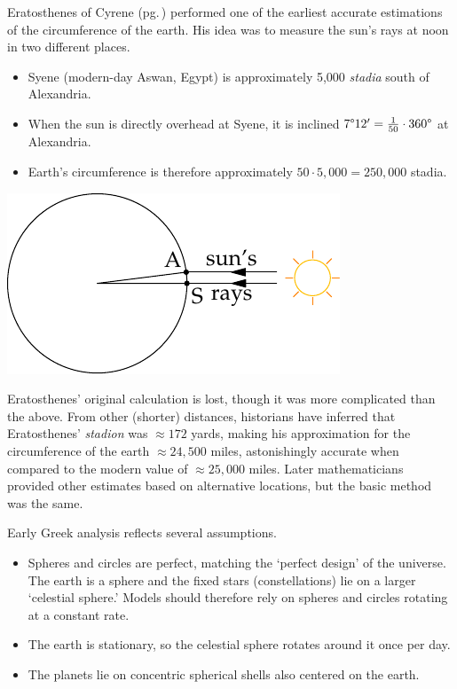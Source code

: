 Eratosthenes of Cyrene (pg.\,\pageref{pg:eratosthenes}) performed one of the earliest accurate estimations of the circumference of the earth. His idea was to measure the sun's rays at noon in two different places.\par
\begin{minipage}[t]{0.6\linewidth}\vspace{-5pt}
\begin{itemize}\itemsep0pt
  \item Syene (modern-day Aswan, Egypt) is approximately 5,000 \emph{stadia} south of Alexandria.
	\item When the sun is directly overhead at Syene, it is inclined $\ang 712'=\frac 1{50}\cdot \ang{360}$ at Alexandria.
	\item Earth's circumference is therefore approximately $50\cdot 5,000=250,000$ stadia.
\end{itemize}
\end{minipage}\hfill\begin{minipage}[t]{0.39\linewidth}\vspace{-5pt}
\flushright\includegraphics[scale=0.95]{geo-18-circearth}
\end{minipage}\bigbreak

Eratosthenes' original calculation is lost, though it was more complicated than the above. From other (shorter) distances, historians have inferred that Eratosthenes' \emph{stadion} was $\approx 172$ yards, making his approximation for the circumference of the earth $\approx 24,500$ miles, astonishingly accurate when compared to the modern value of $\approx 25,000$ miles. Later mathematicians provided other estimates based on alternative locations, but the basic method was the same.


Early Greek analysis reflects several assumptions.
\begin{itemize}
  \item Spheres and circles are perfect, matching the `perfect design' of the universe. The earth is a sphere and the fixed stars (constellations) lie on a larger `celestial sphere.' Models should therefore rely on spheres and circles rotating at a constant rate.
  \item The earth is stationary, so the celestial sphere rotates around it once per day.
  \item The planets lie on concentric spherical shells also centered on the earth.
\end{itemize}

